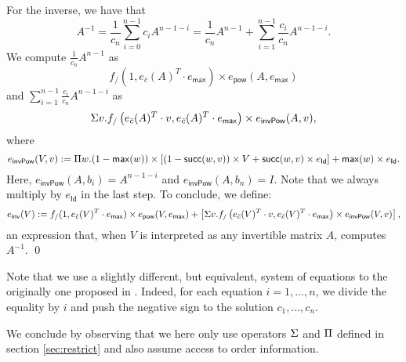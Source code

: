     For the inverse, we have that
    $$
    A^{-1}=\frac{1}{c_n}\sum_{i=0}^{n-1}c_i A^{n-1-i} = \frac{1}{c_n}A^{n-1} + \sum_{i=1}^{n-1}\frac{c_i}{c_n}A^{n-1-i}.
    $$
    We compute $\frac{1}{c_n}A^{n-1}$ as
    $$
    f_{/}(1, e_{\bar c}(A)^T\cdot e_{\mathsf{max}})\times e_{\mathsf{pow}}(A, e_{\mathsf{max}})
    $$
    and $\sum_{i=1}^{n-1}\frac{c_i}{c_n}A^{n-1-i}$ as
    $$
    \Sigma v. f_{/}\left( e_{\bar c}(A)^T\cdot v, e_{\bar c}(A)^T\cdot e_{\mathsf{max}} \right)\times e_{\mathsf{invPow}}(A, v),
    $$
    where
    $$
    e_{\mathsf{invPow}}(V, v):= \Pi w. (1-\mathsf{max}(w)) \times \left[ (1 - \mathsf{succ}(w,v))\times V + \mathsf{succ}(w,v)\times e_{\mathsf{Id}} \right] + \mathsf{max}(w)\times e_{\mathsf{Id}}.
    $$
    Here, $e_{\mathsf{invPow}}(A, b_i)=A^{n-1-i}$ and $e_{\mathsf{invPow}}(A, b_n)=I$.
    Note that we always multiply by $e_{\mathsf{Id}}$ in the last step.
    To conclude, we define:
    $$
    e_{\mathsf{inv}}(V):= f_{/}(1, e_{\bar c}(V)^T\cdot e_{\mathsf{max}})\times e_{\mathsf{pow}}(V, e_{\mathsf{max}}) + \left[ \Sigma v. f_{/}\left( e_{\bar c}(V)^T\cdot v, e_{\bar c}(V)^T\cdot e_{\mathsf{max}} \right)\times e_{\mathsf{invPow}}(V, v) \right],
    $$
    an expression that, when $V$ is interpreted as any invertible matrix $A$, computes $A^{-1}$. \qed

Note that we use a slightly different, but equivalent, system of equations to the originally one proposed in \cite{Csanky76}. Indeed,
for each equation $i=1, \ldots, n$, we divide the equality by $i$ and push the negative sign to the solution $c_1, \ldots, c_n$.

We conclude by observing that we here only use operators $\Sigma$ and $\Pi$ defined in section \ref{sec:restrict} and
also assume access to order information.
